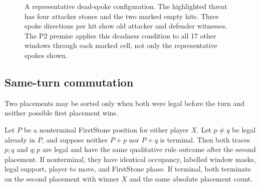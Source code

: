 \begin{figure}[tbp]
  \centering
  \caption{A representative dead-spoke configuration.  The highlighted
  threat has four attacker stones and the two marked empty hits.  Three spoke
  directions per hit show old attacker and defender witnesses.  The P2
  premise applies this deadness condition to all 17 other windows through
  each marked cell, not only the representative spokes shown.}
  \label{fig:dead-spoke}
\end{figure}

\subsection{Same-turn commutation}

Two placements may be sorted only when both were legal before the turn and
neither possible first placement wins.

\begin{proposition}
\label{prop:Dom-P3}
Let $P$ be a nonterminal \textup{FirstStone} position for either player $X$.
Let $p\ne q$ be legal already in $P$, and suppose neither $P+p$ nor $P+q$ is
terminal.  Then both traces $p;q$ and $q;p$ are legal and have the same
qualitative rule outcome after the second placement.  If nonterminal, they
have identical occupancy, labelled window masks, legal support, player to
move, and \textup{FirstStone} phase.  If terminal, both terminate on the
second placement with winner $X$ and the same absolute placement count.
\end{proposition}

